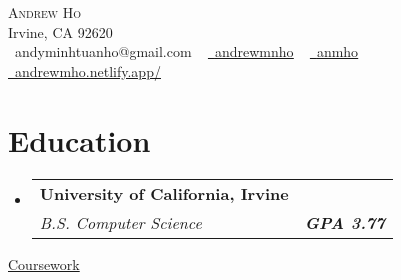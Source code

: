 \documentclass[letterpaper,11pt]{article}
\makeatletter
\newcommand{\resumeSubheading}[4]{
  \vspace{-2pt}\item
    \begin{tabular*}{1.0\textwidth}[t]{l@{\extracolsep{\fill}}r}
      \textbf{#1} & \textbf{\small #2} \\
      \textit{\small#3} & \textit{\small #4} \\
    \end{tabular*}\vspace{-7pt}
}
\newcommand{\resumeSubHeadingListStart}{\begin{itemize}[leftmargin=0.0in, label={}]}
\newcommand{\resumeSubHeadingListEnd}{\end{itemize}}
\makeatother
\begin{document}

\begin{center}
    {\Huge \scshape Andrew Ho} \\ \vspace{1pt}
    Irvine, CA 92620 \\ \vspace{1pt}
    \raisebox{-0.2\height}\faEnvelope\  {andyminhtuanho@gmail.com} ~
    \href{https://linkedin.com/in/andrewmnho/}{\raisebox{-0.2\height}\faLinkedin\ \underline{andrewmnho}}  ~
    \href{https://github.com/}{\raisebox{-0.2\height}\faGithub\ \underline{anmho}}~
    \href{https://andrewmho.netlify.app//}{\raisebox{-0.2\height}\faGlobe\ \underline{andrewmho.netlify.app/}}
    \vspace{-8pt}
\end{center}


\section{Education}
\resumeSubHeadingListStart
\resumeSubheading
{University of California, Irvine \normalfont{\small{}}}
{\normalfont{Exp. June 2024}}
{B.S. Computer Science} {\textbf{GPA 3.77}}
\resumeSubHeadingListEnd
\underline{Coursework}{}

\vspace{-4pt}
\end{document}

